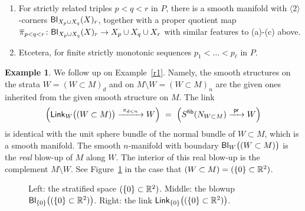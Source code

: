 \documentclass{article}
\newcommand{\msf}[1]{\mathsf{#1}}
\newcommand{\link}{\msf{Link}}
\newcommand{\bl}{\msf{Bl}}
\newcommand{\pr}{\msf{pr}}
\newcommand{\lag}{\langle}
\newcommand{\rag}{\rangle}
\newcommand{\ov}{\overline}
\newcommand{\xra}{\xrightarrow}
\theoremstyle{definition}
\newtheorem{example}[theorem]{Example}
\begin{document}
\begin{enumerate}
\item
For strictly related triples $p<q<r$ in $P$, there is a smooth manifold with $\lag 2 \rag$-corners ${\sf Bl}_{X_p\cup X_q}(X)_r$, together with a proper quotient map $\ov{\pi}_{p<q<r}\colon {\sf Bl}_{X_p\cup X_q}(X)_r\to X_p\cup X_q \cup X_r$ with similar features to (a)-(c) above.  

\item
Etcetera, for finite strictly monotonic sequences $p_1<\dots<p_\ell$ in $P$. 
\end{enumerate}

\begin{example}\label{r2}
We follow up on Example~\ref{r1}.
Namely, the smooth structures on the strata $W = (W\subset M)_d$ and on $M\setminus W = (W\subset M)_n$ are the given ones inherited from the given smooth structure on $M$.  
The link 
\[
\Bigl(
\link_{W}\bigl( (W\subset M) \bigr)  \xra{~\pi_{d<n}~} W
\Bigr)
~=~
\Bigl(
S^{\sf fib}(N_{W\subset M}) \xra{~\pr~} W
\Bigr)
\]
is identical with the unit sphere bundle of the normal bundle of $W\subset M$, which is a smooth manifold.
The smooth $n$-manifold with boundary ${\sf Bl}_W\bigl( (W\subset M) \bigr)$ is the \emph{real} blow-up of $M$ along $W$.  
The interior of this real blow-up is the complement $M\setminus W$.  
See Figure~\ref{fig:R2} in the case that $(W\subset M) = (\{0\}\subset \mathbb R^2)$. 
\end{example}

\begin{figure}
    \begin{center}
    \qquad
     \qquad
    \end{center}
    \caption{Left: the stratified space $(\{0\} \subset \mathbb R^2)$. Middle: the blowup $\bl_{\{0\}}\bigl( (\{0\}\subset \RR^2) \bigr)$. Right: the link $\link_{\{0\}}\bigl( (\{0\} \subset \RR^2) \bigr)$.}
    \label{fig:R2}
\end{figure}
\end{document}
